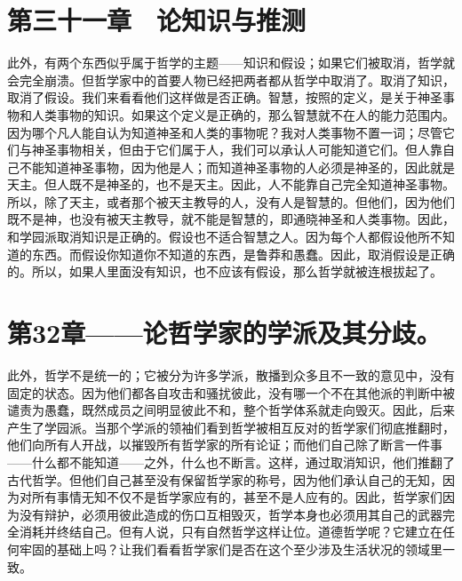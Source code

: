 
\section{第三十一章　论知识与推测}

此外，有两个东西似乎属于哲学的主题——知识和假设；如果它们被取消，哲学就会完全崩溃。但哲学家中的首要人物已经把两者都从哲学中取消了。取消了知识，取消了假设。我们来看看他们这样做是否正确。智慧，按照的定义，是关于神圣事物和人类事物的知识。如果这个定义是正确的，那么智慧就不在人的能力范围内。因为哪个凡人能自认为知道神圣和人类的事物呢？我对人类事物不置一词；尽管它们与神圣事物相关，但由于它们属于人，我们可以承认人可能知道它们。但人靠自己不能知道神圣事物，因为他是人；而知道神圣事物的人必须是神圣的，因此就是天主。但人既不是神圣的，也不是天主。因此，人不能靠自己完全知道神圣事物。所以，除了天主，或者那个被天主教导的人，没有人是智慧的。但他们，因为他们既不是神，也没有被天主教导，就不能是智慧的，即通晓神圣和人类事物。因此，和学园派取消知识是正确的。假设也不适合智慧之人。因为每个人都假设他所不知道的东西。而假设你知道你不知道的东西，是鲁莽和愚蠢。因此，取消假设是正确的。所以，如果人里面没有知识，也不应该有假设，那么哲学就被连根拔起了。\par


\section{第32章——论哲学家的学派及其分歧。}

此外，哲学不是统一的；它被分为许多学派，散播到众多且不一致的意见中，没有固定的状态。因为他们都各自攻击和骚扰彼此，没有哪一个不在其他派的判断中被谴责为愚蠢，既然成员之间明显彼此不和，整个哲学体系就走向毁灭。因此，后来产生了学园派。当那个学派的领袖们看到哲学被相互反对的哲学家们彻底推翻时，他们向所有人开战，以摧毁所有哲学家的所有论证；而他们自己除了断言一件事——什么都不能知道——之外，什么也不断言。这样，通过取消知识，他们推翻了古代哲学。但他们自己甚至没有保留哲学家的称号，因为他们承认自己的无知，因为对所有事情无知不仅不是哲学家应有的，甚至不是人应有的。因此，哲学家们因为没有辩护，必须用彼此造成的伤口互相毁灭，哲学本身也必须用其自己的武器完全消耗并终结自己。但有人说，只有自然哲学这样让位。道德哲学呢？它建立在任何牢固的基础上吗？让我们看看哲学家们是否在这个至少涉及生活状况的领域里一致。\par

